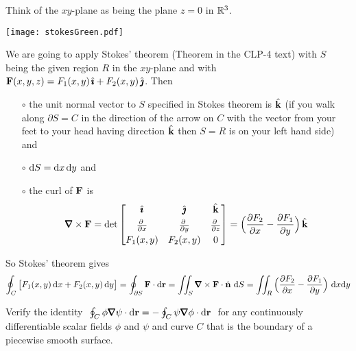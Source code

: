 \begin{solution} Think of the $xy$-plane as being the plane $z=0$ in $\mathbb{R}^3$.
     \begin{center}
        \texttt{[image: stokesGreen.pdf]}
    \end{center}
We are going to apply Stokes' theorem (Theorem  
in the CLP-4 text) with $S$ being the given region $R$ in the $xy$-plane 
and with $\mathbf{F}(x,y,z) = F_1(x,y)\,\hat{\pmb{\imath}} +F_2(x,y)\,\hat{\pmb{\jmath}}$.
Then 
\begin{itemize}\itemsep1pt \parskip0pt  %
\item[$\circ$]
the unit normal vector to $S$ specified in Stokes theorem is $\hat{\mathbf{k}}$
(if you walk along $\partial S = C$ in the direction of the arrow
    on $C$ with the vector from your feet to your head  having direction $\hat{\mathbf{k}}$
    then $S=R$ is on your left hand side) and
\item[$\circ$]
$\mathrm{d}S=\mathrm{d}x\,\mathrm{d}y$ and
\item[$\circ$] the curl of $\mathbf{F}$ is
\begin{equation*}
\vnabla\times\vF=\det\left[\begin{matrix}\hi & \hj & \hk \\[0.05in]
                  \pdiff{}{x} &
                  \pdiff{}{y} &
                  \pdiff{}{z} \\[0.05in]
                  F_1(x,y) & F_2(x,y) & 0 \end{matrix}\right] 
=\Big(\frac{\partial F_2}{\partial x} 
                - \frac{\partial F_1}{\partial y}\Big)\,\hk
\end{equation*}
\end{itemize}  
So Stokes' theorem gives
\begin{align*}
\oint_{C} \big[F_1(x,y)\,\dee{x} +F_2(x,y)\,\dee{y}\big]
=\oint_{\partial S}\vF\cdot \dee{\vr}
  =\dblInt_{S}\vnabla\times\vF\cdot\hn\ \dee{S}
=\dblInt_{R}\Big(\frac{\partial F_2}{\partial x} 
                - \frac{\partial F_1}{\partial y}\Big)\ \dee{x}\dee{y}
\end{align*}

\end{solution} 

\begin{question}
Verify the identity 
$\ \oint_C\phi\vnabla\psi\cdot \dee{\vr}=-\oint_C\psi\vnabla\phi\cdot
                       \dee{\vr}\ $
for any continuously differentiable scalar fields $\phi$ and $\psi$ and
curve $C$ that is the boundary of a piecewise smooth surface.
\end{question}

